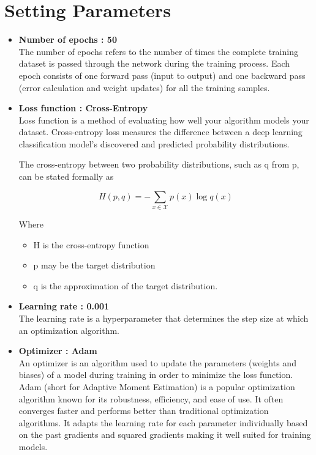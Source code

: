 	\section{Setting Parameters}
	\begin{itemize}
		\item \textbf{Number of epochs : 50} \\
			The number of epochs refers to the number of times the complete training dataset is passed through the network during the training process. Each epoch consists of one forward pass (input to output) and one backward pass (error calculation and weight updates) for all the training samples.
		\item \textbf{Loss function : Cross-Entropy} \\
			Loss function is a method of evaluating how well your algorithm models your dataset. Cross-entropy loss measures the difference between a deep learning classification model's discovered and predicted probability distributions.

			The cross-entropy between two probability distributions, such as q from p, can be stated formally as
			
			\begin{equation}
				H(p, q) = -\sum_{x \in \mathcal{X}} p(x) \log q(x)
			\end{equation}

			Where
			\begin{itemize}
				\item H is the cross-entropy function
				\item p may be the target distribution
				\item q is the approximation of the target distribution.
			\end{itemize} 

		\item \textbf{Learning rate : 0.001} \\
			The learning rate is a hyperparameter that determines the step size at which an optimization algorithm.
		\item \textbf{Optimizer : Adam} \\
			An optimizer  is an algorithm used to update the parameters (weights and biases) of a model during training in order to minimize the loss function. 
			Adam (short for Adaptive Moment Estimation) is a popular optimization algorithm known for its robustness, efficiency, and ease of use. It often converges faster and performs better than traditional optimization algorithms.
			It adapts the learning rate for each parameter individually based on the past gradients and squared gradients making it well suited for training models.
	\end{itemize}

